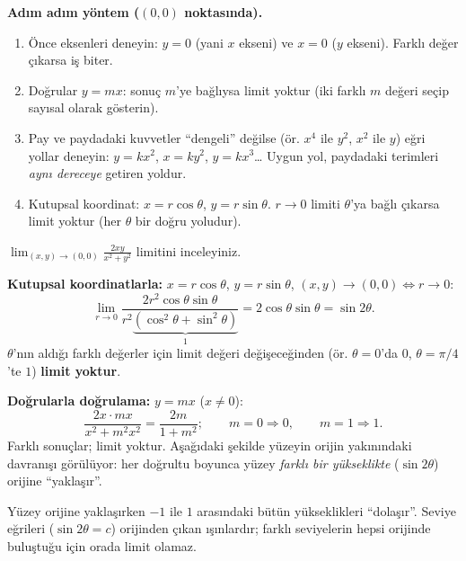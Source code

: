\textbf{Adım adım yöntem ($(0,0)$ noktasında).}
\begin{enumerate}
  \item Önce eksenleri deneyin: $y=0$ (yani $x$ ekseni) ve $x=0$ ($y$ ekseni). Farklı değer çıkarsa iş biter.
  \item Doğrular $y=mx$: sonuç $m$'ye bağlıysa limit yoktur (iki farklı $m$ değeri seçip sayısal olarak gösterin).
  \item Pay ve paydadaki kuvvetler ``dengeli'' değilse (ör. $x^4$ ile $y^2$, $x^2$ ile $y$) eğri yollar deneyin:
        $y=kx^2$, $x=ky^2$, $y=kx^3$\dots{} Uygun yol, paydadaki terimleri \emph{aynı dereceye} getiren yoldur.
  \item Kutupsal koordinat: $x=r\cos\theta$, $y=r\sin\theta$. $r\to0$ limiti $\theta$'ya bağlı çıkarsa limit yoktur
        (her $\theta$ bir doğru yoludur).
\end{enumerate}

\begin{soru}
$\displaystyle\lim_{(x,y)\to(0,0)}\frac{2xy}{x^2+y^2}$ limitini inceleyiniz.
\end{soru}
\begin{cevap}
\textbf{Kutupsal koordinatlarla:} $x=r\cos\theta$, $y=r\sin\theta$, $(x,y)\to(0,0)\Leftrightarrow r\to0$:
\[
\lim_{r\to0}\frac{2r^2\cos\theta\sin\theta}{r^2\underbrace{(\cos^2\theta+\sin^2\theta)}_{1}}=2\cos\theta\sin\theta=\sin2\theta .
\]
$\theta$'nın aldığı farklı değerler için limit değeri değişeceğinden (ör. $\theta=0$'da $0$, $\theta=\pi/4$'te $1$)
\textbf{limit yoktur}.

\textbf{Doğrularla doğrulama:} $y=mx$ ($x\neq0$):
\[
\frac{2x\cdot mx}{x^2+m^2x^2}=\frac{2m}{1+m^2};\qquad m=0\Rightarrow 0,\qquad m=1\Rightarrow 1 .
\]
Farklı sonuçlar; limit yoktur. Aşağıdaki şekilde yüzeyin orijin yakınındaki davranışı görülüyor: her doğrultu boyunca
yüzey \emph{farklı bir yükseklikte} ($\sin2\theta$) orijine ``yaklaşır''.
\end{cevap}

\begin{center}
\end{center}
{\small\color{gri} Yüzey orijine yaklaşırken $-1$ ile $1$ arasındaki bütün yükseklikleri ``dolaşır''. Seviye eğrileri
($\sin2\theta=c$) orijinden çıkan ışınlardır; farklı seviyelerin hepsi orijinde buluştuğu için orada limit olamaz.}

